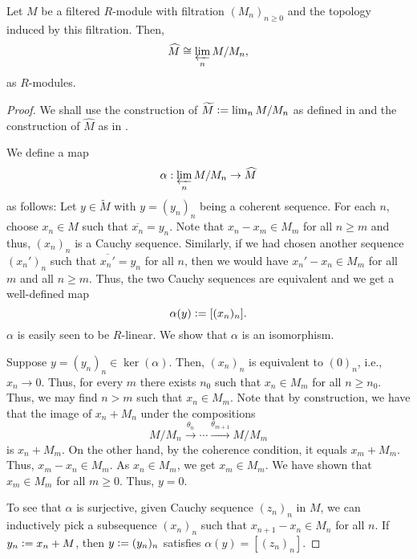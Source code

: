 \begin{prop}
	Let $M$ be a filtered $R$-module with filtration $(M_{n})_{n \ge 0}$ and the topology induced by this filtration. Then,
	\begin{equation*} 
		\widehat{M} \cong \varprojlim_{n} M/M_{n},
	\end{equation*}
	as $R$-modules.
\end{prop}
\begin{proof} 
	We shall use the construction of $\widetilde{M} \vcentcolon= \lim_{n} M/M_{n}$ as defined in  and the construction of $\widehat{M}$ as in . 

	We define a map
	\begin{equation*} 
		\alpha : \varprojlim_{n} M/M_{n} \to \widehat{M}
	\end{equation*}
	as follows: Let $y \in \widetilde{M}$ with $y = (y_{n})_{n}$ being a coherent sequence. For each $n$, choose $x_{n} \in M$ such that $\overline{x_{n}} = y_{n}$. Note that $x_{n} - x_{m} \in M_{m}$ for all $n \ge m$ and thus, $(x_{n})_{n}$ is a Cauchy sequence. \newline
	Similarly, if we had chosen another sequence $(x_{n}')_{n}$ such that $\overline{x_{n}'} = y_{n}$ for all $n$, then we would have $x_{n}' - x_{n} \in M_{m}$ for all $m$ and all $n \ge m$. Thus, the two Cauchy sequences are equivalent and we get a well-defined map
	\begin{equation*} 
		\alpha(y) \vcentcolon= [(x_{n})_{n}].
	\end{equation*}
	$\alpha$ is easily seen to be $R$-linear. We show that $\alpha$ is an isomorphism.

	Suppose $y = (y_{n})_{n} \in \ker(\alpha)$. Then, $(x_{n})_{n}$ is equivalent to $(0)_{n}$, i.e., $x_{n} \to 0$. Thus, for every $m$ there exists $n_{0}$ such that $x_{n} \in M_{m}$ for all $n \ge n_{0}$. Thus, we may find $n > m$ such that $x_{n} \in M_{m}$. Note that by construction, we have that the image of $x_{n} + M_{n}$ under the compositions
	\begin{equation*} 
		M/M_{n} \xrightarrow{\theta_{n}} \cdots \xrightarrow{\theta_{m + 1}} M/M_{m}
	\end{equation*}
	is $x_{n} + M_{m}$. On the other hand, by the coherence condition, it equals $x_{m} + M_{m}$. Thus, $x_{m} - x_{n} \in M_{m}$. As $x_{n} \in M_{m}$, we get $x_{m} \in M_{m}$. We have shown that $x_{m} \in M_{m}$ for all $m \ge 0$. Thus, $y = 0$.

	To see that $\alpha$ is surjective, given Cauchy sequence $(z_{n})_{n}$ in $M$, we can inductively pick a subsequence $(x_{n})_{n}$ such that $x_{n + 1} - x_{n} \in M_{n}$ for all $n$. If $y_{n} \vcentcolon= x_{n} + M$, then $y \vcentcolon= (y_{n})_{n}$ satisfies $\alpha(y) = [(z_{n})_{n}]$.
\end{proof}

